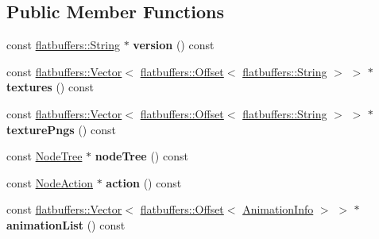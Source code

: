 \subsection*{Public Member Functions}
\begin{DoxyCompactItemize}
\item 
\mbox{\label{structflatbuffers_1_1CSParseBinary_a90fd29051ae981580b86ac108557fbf1}} 
const \hyperlink{structflatbuffers_1_1String}{flatbuffers\+::\+String} $\ast$ {\bfseries version} () const
\item 
\mbox{\label{structflatbuffers_1_1CSParseBinary_a09a7224e510f7724b91fffe8cd2bc892}} 
const \hyperlink{classflatbuffers_1_1Vector}{flatbuffers\+::\+Vector}$<$ \hyperlink{structflatbuffers_1_1Offset}{flatbuffers\+::\+Offset}$<$ \hyperlink{structflatbuffers_1_1String}{flatbuffers\+::\+String} $>$ $>$ $\ast$ {\bfseries textures} () const
\item 
\mbox{\label{structflatbuffers_1_1CSParseBinary_a20ef25308ec0e907d42bd62d659935be}} 
const \hyperlink{classflatbuffers_1_1Vector}{flatbuffers\+::\+Vector}$<$ \hyperlink{structflatbuffers_1_1Offset}{flatbuffers\+::\+Offset}$<$ \hyperlink{structflatbuffers_1_1String}{flatbuffers\+::\+String} $>$ $>$ $\ast$ {\bfseries texture\+Pngs} () const
\item 
\mbox{\label{structflatbuffers_1_1CSParseBinary_a97dc182bfe7b38e00a4d892045d5f6d0}} 
const \hyperlink{structflatbuffers_1_1NodeTree}{Node\+Tree} $\ast$ {\bfseries node\+Tree} () const
\item 
\mbox{\label{structflatbuffers_1_1CSParseBinary_a73dca0466f1137e0ba3678c8d587af8d}} 
const \hyperlink{structflatbuffers_1_1NodeAction}{Node\+Action} $\ast$ {\bfseries action} () const
\item 
\mbox{\label{structflatbuffers_1_1CSParseBinary_a88d2ec51c1af471a804497bcbb7d9ee1}} 
const \hyperlink{classflatbuffers_1_1Vector}{flatbuffers\+::\+Vector}$<$ \hyperlink{structflatbuffers_1_1Offset}{flatbuffers\+::\+Offset}$<$ \hyperlink{structflatbuffers_1_1AnimationInfo}{Animation\+Info} $>$ $>$ $\ast$ {\bfseries animation\+List} () const

\end{DoxyCompactItemize}
